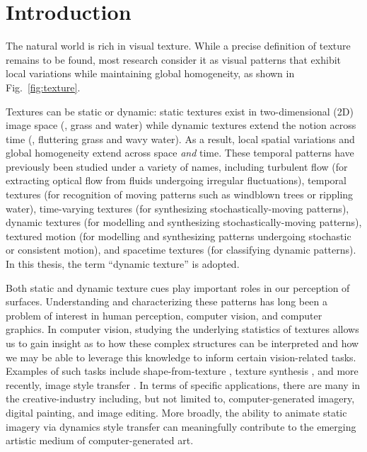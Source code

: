 \chapter{Introduction}

The natural world is rich in visual texture. While a precise definition of 
texture remains to be found, most research consider it as visual patterns that 
exhibit local variations while maintaining global homogeneity, as shown in Fig.\ \ref{fig:texture}.



Textures 
can be static or dynamic: static textures exist in two-dimensional (2D) image space 
(\eg, grass and water) while dynamic textures extend the notion across time (\eg, 
fluttering grass and wavy water). As a result, local spatial variations and 
global homogeneity extend across space \emph{and} time. These temporal patterns 
have previously been studied under a variety of names, including turbulent flow \cite{heeger1986} (for extracting optical flow from fluids undergoing irregular fluctuations), temporal textures \cite{nelson1992} (for recognition of moving patterns such as windblown trees or rippling water), time-varying 
textures \cite{bar-joseph2001} (for synthesizing stochastically-moving patterns), dynamic textures \cite{doretto2003} (for modelling and synthesizing stochastically-moving patterns), textured 
motion \cite{wang2003} (for modelling and synthesizing patterns undergoing stochastic or consistent motion), and spacetime textures \cite{derpanis2012spacetime} (for classifying dynamic patterns).
In this thesis, the term ``dynamic texture'' is adopted.

Both static and dynamic texture cues play important roles in our perception of 
surfaces. Understanding and characterizing these patterns has long been a problem 
of interest in human perception, computer vision, and computer graphics. In 
computer vision, studying the underlying statistics of textures allows us to gain 
insight as to how these complex structures can be interpreted and how we may be 
able to leverage this knowledge to inform certain vision-related tasks. Examples 
of such tasks include shape-from-texture \cite{gibson1950perception}, texture 
synthesis \cite{heeger1995pyramid}, and more recently, image style transfer 
\cite{gatys2016image}. In terms of specific applications, 
there are many in the creative-industry including, but not limited to, computer-generated imagery, digital painting, and image editing. More broadly, the ability 
to animate static imagery via dynamics style transfer can meaningfully contribute 
to the emerging artistic medium of computer-generated art.

